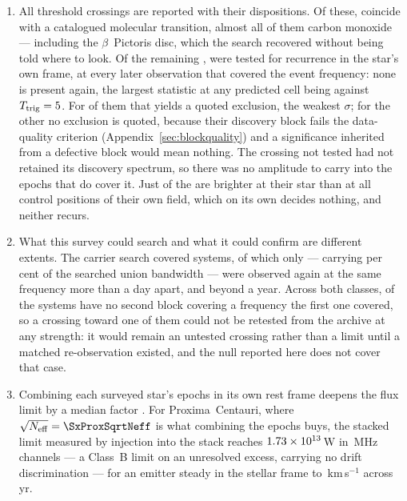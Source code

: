 \begin{enumerate}[leftmargin=1.6em,itemsep=4pt,topsep=4pt,parsep=0pt]
\item All \NCross{} threshold crossings are reported with their dispositions.
Of these, \NAttributed{} coincide with a catalogued molecular transition,
almost all of them carbon monoxide --- including the $\beta$~Pictoris disc,
which the search recovered without being told where to look. Of the remaining
\NUnattributed{}, \CnNTested{} were tested for recurrence in the star's own
frame, at every later observation that covered the event frequency: none is
present again, the largest statistic at any predicted cell being \RcTMax{}
against $T_{\rm trig}=5$. For \CnNNoRecur{} of them that yields a
quoted exclusion, the weakest \RcExclMin$\sigma$; for the other
\CnNFlaggedWord{} no exclusion is quoted, because their discovery block fails
the data-quality criterion (Appendix~\ref{sec:blockquality}) and a
significance inherited from a defective block would mean nothing. The
\CnNNoSpecWord{} crossing not tested had not retained its discovery spectrum,
so there was no
amplitude to carry into the epochs that do cover it. Just
\PrRankWord{} of the \NUnattributed{} are brighter at their star than at all
\NCtrl{} control positions of their own field, which on its own decides
nothing, and neither recurs.

\item What this survey could search and what it could confirm are different
extents. The carrier search covered
\RcSearchSys{} systems, of which only \RcConfSysDay{} --- carrying
\CvConfPctDay{} per cent of the searched union bandwidth --- were observed
again at the same frequency more than a day apart, and \RcConfSysYr{} beyond
a year. Across both classes, \RcNoRepSysAll{} of the \RcSearchSysAll{}
systems have no second block covering a frequency the first one covered, so a
crossing toward one of them could not be retested from the archive at any
strength: it would remain an untested crossing rather than a limit until a
matched re-observation existed, and the null reported here does not cover
that case.

\item Combining each surveyed star's epochs in its own rest frame deepens
the flux limit by a median factor \SyStkGainMed. For Proxima~Centauri,
where $\sqrt{N_{\rm eff}}=\SxProxSqrtNeff$ is what combining the epochs
buys, the stacked limit measured by injection into the stack reaches
$1.73\times10^{13}$\,W in \ChanBModeMHz\,MHz channels --- a Class~B limit on
an unresolved excess, carrying no drift discrimination --- for an emitter
steady in the stellar frame to \StkProxTolKms\,km\,s$^{-1}$ across
\StkProxSpanYr\,yr.


\end{enumerate}
